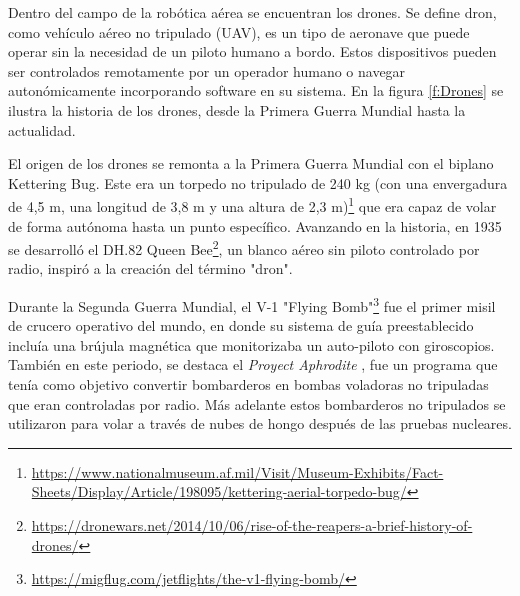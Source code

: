 Dentro del campo de la robótica aérea se encuentran los drones. Se define dron, como vehículo aéreo no tripulado (UAV), es un tipo de aeronave que puede operar sin la 
necesidad de un piloto humano a bordo. Estos dispositivos pueden ser controlados remotamente por un operador humano o navegar autonómicamente incorporando software 
en su sistema. En la figura \ref{f:Drones} se ilustra la historia de los drones, desde la Primera Guerra Mundial hasta la actualidad.

El origen de los drones se remonta a la Primera Guerra Mundial con el biplano Kettering Bug.
Este era un torpedo no tripulado de 240 kg (con una envergadura de 4,5 m, una longitud de
3,8 m y una altura de 2,3 m)\footnote{\url{https://www.nationalmuseum.af.mil/Visit/Museum-Exhibits/Fact-Sheets/Display/Article/198095/kettering-aerial-torpedo-bug/}} que era capaz 
de volar de forma autónoma hasta un punto específico. 
Avanzando en la historia, en 1935 se desarrolló el DH.82 Queen Bee\footnote{\url{https://dronewars.net/2014/10/06/rise-of-the-reapers-a-brief-history-of-drones/}}, un blanco aéreo
sin piloto controlado por radio, inspiró a la creación del término "dron". 

Durante la Segunda Guerra Mundial, el V-1 "Flying Bomb"\footnote{\url{https://migflug.com/jetflights/the-v1-flying-bomb/}} fue el primer misil
de crucero operativo del mundo, en donde su sistema de guía preestablecido incluía una brújula magnética que monitorizaba un auto-piloto con giroscopios. También en este periodo, se destaca el \textit{Proyect Aphrodite} \cite{Aphrodite}, 
fue un programa que tenía como objetivo convertir bombarderos en bombas voladoras no tripuladas que eran controladas por radio. Más adelante estos bombarderos no tripulados se utilizaron para volar a través de nubes de hongo
después de las pruebas nucleares. 

